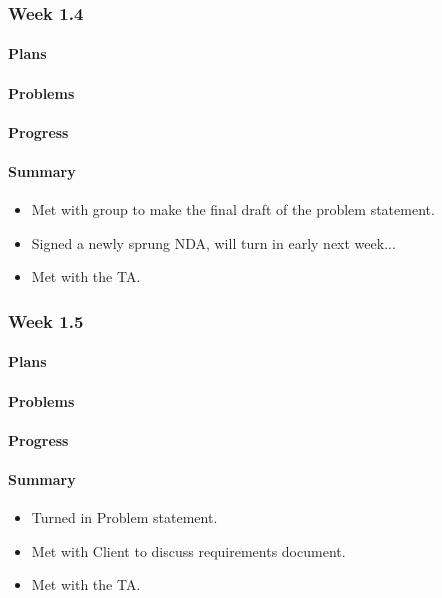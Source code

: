\documentclass[onecolumn, draftclsnofoot,10pt, compsoc]{article}
\begin{document}
		\subsubsection{Week 1.4}
			\paragraph{Plans} \hfill \break

		    \paragraph{Problems} \hfill \break

		    \paragraph{Progress} \hfill \break
		    
		    \paragraph{Summary}
		    	\begin{itemize}
		            \item Met with group to make the final draft of the problem statement.
                    \item Signed a newly sprung NDA, will turn in early next week... 
                    \item  Met with the TA.
                \end{itemize}


		\subsubsection{Week 1.5}
		
		    \paragraph{Plans} \hfill \break

		    \paragraph{Problems} \hfill \break

		    \paragraph{Progress} \hfill \break

		    \paragraph{Summary} \hfill \break
		    	\begin{itemize}
		            \item Turned in Problem statement.
                    \item Met with Client to discuss requirements document.
                    \item Met with the TA.\\
                \end{itemize}
\end{document}
